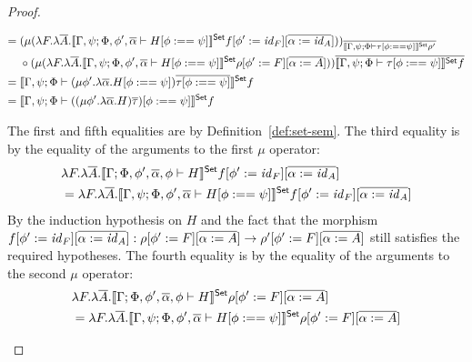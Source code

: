 \documentclass[acmsmall,review,anonymous]{acmart}
\theoremstyle{definition}
\newcommand{\set}{\mathsf{Set}}
\renewcommand{\id}{\mathit{id}}
\begin{document}
\begin{proof}
\begin{itemize}
\begin{align*}
        = \; & 
           (\mu (
              \lambda F. \lambda \ol{A}. \setsem{\Gamma, \psi; \Phi, \phi', \ol{\alpha} \vdash H[\phi :== \psi]} f [\phi' := \id_F][\ol{\alpha := \id_A}]
           ))_{\ol{\setsem{\Gamma, \psi; \Phi \vdash \tau[\phi :== \psi]} \rho'}} \\
          \; & \circ
          (\mu (
            \lambda F. \lambda \ol{A}. \setsem{\Gamma, \psi; \Phi, \phi', \ol{\alpha} \vdash H[\phi :== \psi]} \rho[\phi' := F][\ol{\alpha := A}]
          )
        ) \ol{\setsem{ \Gamma, \psi; \Phi \vdash \tau[\phi :== \psi]} f} \\
        = \; & \setsem{\Gamma, \psi; \Phi \vdash (\mu \phi'. \lambda \ol\alpha. H[\phi :== \psi]) \ol{\tau[\phi :== \psi]} } f \\
        = \; & \setsem{\Gamma, \psi; \Phi \vdash ((\mu \phi'. \lambda \ol\alpha. H) \ol\tau)[\phi :== \psi] } f
      \end{align*} 

      \noindent
      The first and fifth equalities are by Definition~\ref{def:set-sem}.
      The third equality is by the equality of the arguments to the first $\mu$ operator:
      \begin{align*}
        & \lambda F. \lambda \ol{A}. \setsem{\Gamma; \Phi, \phi', \ol{\alpha}, \phi \vdash H} f [\phi' := \id_F][\ol{\alpha := \id_A}] \\
        & = \lambda F. \lambda \ol{A}. \setsem{\Gamma, \psi; \Phi, \phi', \ol{\alpha} \vdash H[\phi :== \psi]} f [\phi' := \id_F][\ol{\alpha := \id_A}]
      \end{align*}
      By the induction hypothesis on $H$ and the fact that the morphism $f[\phi' := \id_F][\ol{\alpha := \id_A}]
      : \rho[\phi' := F][\ol{\alpha := A}] \to \rho'[\phi' := F][\ol{\alpha := A}]$
      still satisfies the required hypotheses.
      The fourth equality is by the equality of the arguments to the second $\mu$ operator:
      \begin{align*}
        & \lambda F. \lambda \ol{A}. \setsem{\Gamma; \Phi, \phi', \ol{\alpha}, \phi \vdash H} \rho[\phi' := F][\ol{\alpha := A}] \\
        & = \lambda F. \lambda \ol{A}. \setsem{\Gamma, \psi; \Phi, \phi', \ol{\alpha} \vdash H[\phi :== \psi]} \rho[\phi' := F][\ol{\alpha := A}]
      \end{align*}


\end{itemize}
\end{proof}
\end{document}
